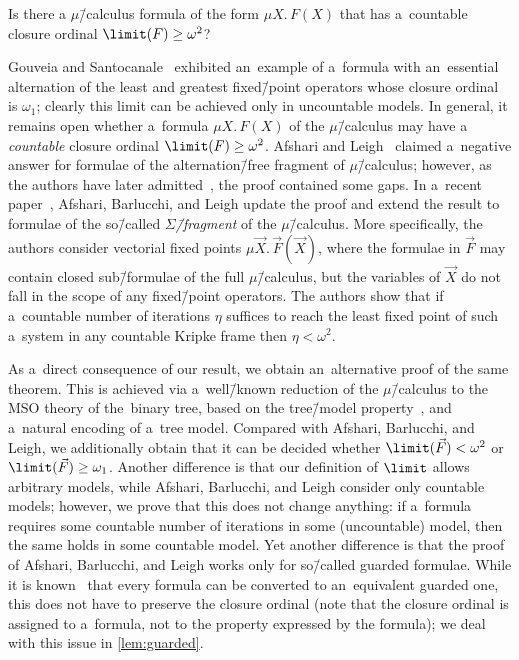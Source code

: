 \documentclass{lmcs}
\numberwithin{equation}{section}
\numberwithin{figure}{section}
\begin{document}
\begin{qu}\label{con:czarnecki}
	Is there a $\mu$\=/calculus formula of the form $\mu X.\,F(X)$ that has a~countable closure ordinal $\limit(F)\geq\omega^2$?
\end{qu}

Gouveia and Santocanale~\cite{santocanale-closure} exhibited an~example of a~formula with an~essential alternation of the least and greatest fixed\=/point operators whose closure ordinal is $\omega_1$; clearly this limit can be achieved only in uncountable models.
In general, it remains open whether a~formula $\mu X.\,F(X)$ of the $\mu$\=/calculus may have a \emph{countable} closure ordinal $\limit(F) \geq \omega^2$.
Afshari and Leigh~\cite{afshari_closure} claimed a~negative answer for formulae of the alternation\=/free fragment of $\mu$\=/calculus;
however, as the authors have later admitted~\cite{afshari_limit_fics}, the proof contained some gaps.
In a~recent paper~\cite{afshari_limit_fics}, Afshari, Barlucchi, and Leigh update the proof and extend the result to formulae of the so\=/called \emph{$\Sigma$\=/fragment} of the $\mu$\=/calculus.
More specifically, the authors consider vectorial fixed points $\mu \vec{X}.\,\vec{F}(\vec{X})$,
where the formulae in $\vec{F}$ may contain closed sub\=/formulae of the full $\mu$\=/calculus, but the variables of $\vec{X}$ do not fall in the scope of any fixed\=/point operators.
The authors show that if a~countable number of iterations $\eta$ suffices to reach the least fixed point of such a~system in any countable Kripke frame then $\eta < \omega^2$.

As a~direct consequence of our result, we obtain an~alternative proof of the same theorem.
This is achieved via a~well\=/known reduction of the $\mu$\=/calculus to the MSO theory of the~binary tree,
based on the tree\=/model property~\cite{julian-igor-handook}, and a~natural encoding of a~tree model.
Compared with Afshari, Barlucchi, and Leigh, we additionally obtain that it can be decided whether $\limit(\vec{F}) < \omega^2$ or $\limit(\vec{F})\geq\omega_1$.
Another difference is that our definition of $\limit$ allows arbitrary models, while Afshari, Barlucchi, and Leigh consider only countable models;
however, we prove that this does not change anything: if a~formula requires some countable number of iterations in some (uncountable) model, then the same holds in some countable model.
Yet another difference is that the proof of Afshari, Barlucchi, and Leigh works only for so\=/called guarded formulae.
While it is known~\cite{kozen-mu-calc} that every formula can be converted to an~equivalent guarded one, this does not have to preserve the closure ordinal
(note that the closure ordinal is assigned to a~formula, not to the property expressed by the formula); we deal with this issue in \cref{lem:guarded}.
\end{document}
